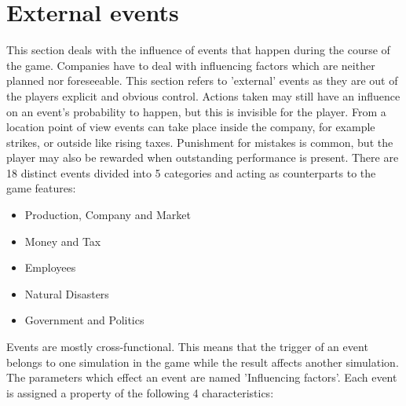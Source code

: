 \documentclass[11pt,titlepage,oneside,openany]{book}
\begin{document}
\section{External events}
This section deals with the influence of events that happen during the course of the game. Companies have to deal with influencing factors which are neither planned nor foreseeable\cite{Campbell}. This section refers to 'external' events as they are out of the players explicit and obvious control. Actions taken may still have an influence on an event's probability to happen, but this is invisible for the player. From a location point of view events can take place inside the company, for example strikes, or outside like rising taxes. Punishment for mistakes is common, but the player may also be rewarded when outstanding performance is present. There are 18 distinct events divided into 5 categories and acting as counterparts to the game features:
\begin{itemize}
\item Production, Company and Market
\item Money and Tax
\item Employees
\item Natural Disasters
\item Government and Politics
\end{itemize}

Events are mostly cross-functional. This means that the trigger of an event belongs to one simulation in the game while the result affects another simulation. The parameters which effect an event are named 'Influencing factors'. Each event is assigned a property of the following 4 characteristics:
\end{document}
